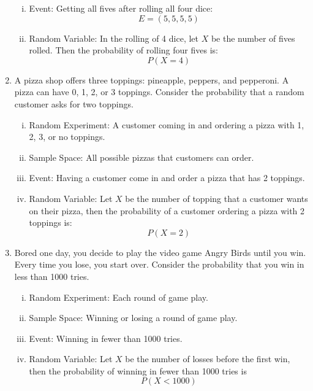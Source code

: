 \documentclass{article}
\begin{document}
\begin{large}
\begin{enumerate}[1.]
\begin{enumerate}[i.]
			\item Event: Getting all fives after rolling all four dice:$$E = (5,5,5,5)$$
		
			\item Random Variable: In the rolling of 4 dice, let $X$ be the number of fives rolled. Then the probability of rolling four fives is: $$P(X = 4)$$
		
		\end{enumerate}
		
		\item A pizza shop offers three toppings: pineapple, peppers, and pepperoni. A
pizza can have 0, 1, 2, or 3 toppings. Consider the probability that a random
customer asks for two toppings.	
		\begin{enumerate}[i.]
			\item Random Experiment: A customer coming in and ordering a pizza with 1, 2, 3, or no toppings.
		
			\item Sample Space: All possible pizzas that customers can order.
		
			\item Event: Having a customer come in and order a pizza that has 2 toppings.
		
			\item Random Variable: Let $X$ be the number of topping that a customer wants on their pizza, then the probability of a customer ordering a pizza with 2 toppings is:
			$$P(X=2)$$
		
		\end{enumerate}		
		
		\item Bored one day, you decide to play the video game Angry Birds until you win.
Every time you lose, you start over. Consider the probability that you win in
less than 1000 tries.
		\begin{enumerate}[i.]
			\item Random Experiment: Each round of game play.
		
			\item Sample Space: Winning or losing a round of game play.
		
			\item Event: Winning in fewer than 1000 tries.
		
			\item Random Variable: Let $X$ be the number of losses before the first win, then the probability of winning in fewer than 1000 tries is $$P(X < 1000)$$
 		

\end{enumerate}
\end{enumerate}
\end{large}
\end{document}
